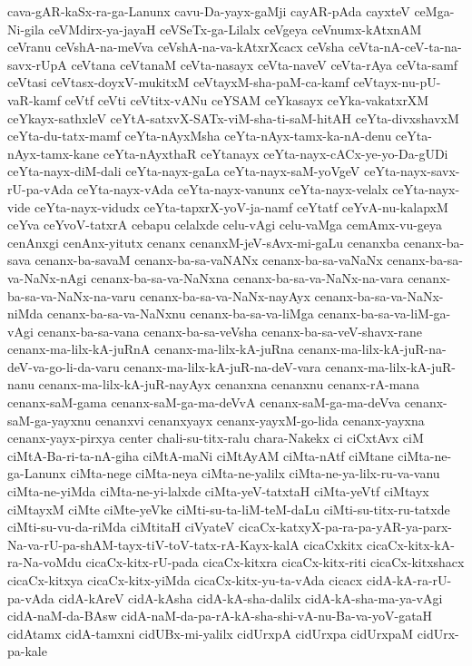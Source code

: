 {cava-gAR-kaSx-ra-ga-Lanunx
cavu-Da-yayx-gaMji
cayAR-pAda
cayxteV
ceMga-Ni-gila
ceVMdirx-ya-jayaH
ceVSeTx-ga-Lilalx
ceVgeya
ceVnumx-kAtxnAM
ceVranu
ceVshA-na-meVva
ceVshA-na-va-kAtxrXcacx
ceVsha
ceVta-nA-ceV-ta-na-savx-rUpA
ceVtana
ceVtanaM
ceVta-nasayx
ceVta-naveV
ceVta-rAya
ceVta-samf
ceVtasi
ceVtasx-doyxV-mukitxM
ceVtayxM-sha-paM-ca-kamf
ceVtayx-nu-pU-vaR-kamf
ceVtf
ceVti
ceVtitx-vANu
ceYSAM
ceYkasayx
ceYka-vakatxrXM
ceYkayx-sathxleV
ceYtA-satxvX-SATx-viM-sha-ti-saM-hitAH
ceYta-divxshavxM
ceYta-du-tatx-mamf
ceYta-nAyxMsha
ceYta-nAyx-tamx-ka-nA-denu
ceYta-nAyx-tamx-kane
ceYta-nAyxthaR
ceYtanayx
ceYta-nayx-cACx-ye-yo-Da-gUDi
ceYta-nayx-diM-dali
ceYta-nayx-gaLa
ceYta-nayx-saM-yoVgeV
ceYta-nayx-savx-rU-pa-vAda
ceYta-nayx-vAda
ceYta-nayx-vanunx
ceYta-nayx-velalx
ceYta-nayx-vide
ceYta-nayx-vidudx
ceYta-tapxrX-yoV-ja-namf
ceYtatf
ceYvA-nu-kalapxM
ceYva
ceYvoV-tatxrA
cebapu
celalxde
celu-vAgi
celu-vaMga
cemAmx-vu-geya
cenAnxgi
cenAnx-yitutx
cenanx
cenanxM-jeV-sAvx-mi-gaLu
cenanxba
cenanx-ba-sava
cenanx-ba-savaM
cenanx-ba-sa-vaNANx
cenanx-ba-sa-vaNaNx
cenanx-ba-sa-va-NaNx-nAgi
cenanx-ba-sa-va-NaNxna
cenanx-ba-sa-va-NaNx-na-vara
cenanx-ba-sa-va-NaNx-na-varu
cenanx-ba-sa-va-NaNx-nayAyx
cenanx-ba-sa-va-NaNx-niMda
cenanx-ba-sa-va-NaNxnu
cenanx-ba-sa-va-liMga
cenanx-ba-sa-va-liM-ga-vAgi
cenanx-ba-sa-vana
cenanx-ba-sa-veVsha
cenanx-ba-sa-veV-shavx-rane
cenanx-ma-lilx-kA-juRnA
cenanx-ma-lilx-kA-juRna
cenanx-ma-lilx-kA-juR-na-deV-va-go-li-da-varu
cenanx-ma-lilx-kA-juR-na-deV-vara
cenanx-ma-lilx-kA-juR-nanu
cenanx-ma-lilx-kA-juR-nayAyx
cenanxna
cenanxnu
cenanx-rA-mana
cenanx-saM-gama
cenanx-saM-ga-ma-deVvA
cenanx-saM-ga-ma-deVva
cenanx-saM-ga-yayxnu
cenanxvi
cenanxyayx
cenanx-yayxM-go-lida
cenanx-yayxna
cenanx-yayx-pirxya
center
chali-su-titx-ralu
chara-Nakekx
ci
ciCxtAvx
ciM
ciMtA-Ba-ri-ta-nA-giha
ciMtA-maNi
ciMtAyAM
ciMta-nAtf
ciMtane
ciMta-ne-ga-Lanunx
ciMta-nege
ciMta-neya
ciMta-ne-yalilx
ciMta-ne-ya-lilx-ru-va-vanu
ciMta-ne-yiMda
ciMta-ne-yi-lalxde
ciMta-yeV-tatxtaH
ciMta-yeVtf
ciMtayx
ciMtayxM
ciMte
ciMte-yeVke
ciMti-su-ta-liM-teM-daLu
ciMti-su-titx-ru-tatxde
ciMti-su-vu-da-riMda
ciMtitaH
ciVyateV
cicaCx-katxyX-pa-ra-pa-yAR-ya-parx-Na-va-rU-pa-shAM-tayx-tiV-toV-tatx-rA-Kayx-kalA
cicaCxkitx
cicaCx-kitx-kA-ra-Na-voMdu
cicaCx-kitx-rU-pada
cicaCx-kitxra
cicaCx-kitx-riti
cicaCx-kitxshacx
cicaCx-kitxya
cicaCx-kitx-yiMda
cicaCx-kitx-yu-ta-vAda
cicacx
cidA-kA-ra-rU-pa-vAda
cidA-kAreV
cidA-kAsha
cidA-kA-sha-dalilx
cidA-kA-sha-ma-ya-vAgi
cidA-naM-da-BAsw
cidA-naM-da-pa-rA-kA-sha-shi-vA-nu-Ba-va-yoV-gataH
cidAtamx
cidA-tamxni
cidUBx-mi-yalilx
cidUrxpA
cidUrxpa
cidUrxpaM
cidUrx-pa-kale
}
